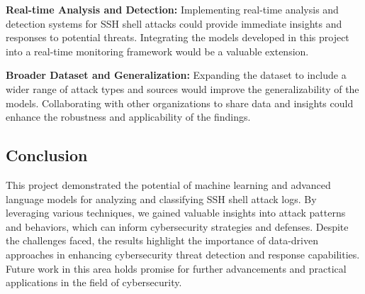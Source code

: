         \textbf{Real-time Analysis and Detection:} Implementing real-time analysis and detection systems for SSH shell attacks could provide immediate insights and responses to potential threats. Integrating the models developed in this project into a real-time monitoring framework would be a valuable extension.

        \textbf{Broader Dataset and Generalization:} Expanding the dataset to include a wider range of attack types and sources would improve the generalizability of the models. Collaborating with other organizations to share data and insights could enhance the robustness and applicability of the findings.

    \subsection{Conclusion}
    
        This project demonstrated the potential of machine learning and advanced language models for analyzing and classifying SSH shell attack logs. By leveraging various techniques, we gained valuable insights into attack patterns and behaviors, which can inform cybersecurity strategies and defenses. Despite the challenges faced, the results highlight the importance of data-driven approaches in enhancing cybersecurity threat detection and response capabilities. Future work in this area holds promise for further advancements and practical applications in the field of cybersecurity.
